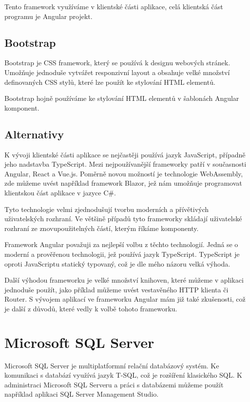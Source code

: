 Tento framework využíváme v klientské části aplikace, celá klientská část programu je Angular projekt.

\subsection{Bootstrap}
Bootstrap je CSS framework, který se používá k designu webových stránek.
Umožňuje jednoduše vytvářet responzivní layout a obsahuje velké množství definovaných CSS stylů, které lze použít ke stylování HTML elementů.
\cite{BootstrapDocs}

Bootstrap hojně používáme ke stylování HTML elementů v šablonách Angular komponent.

\subsection{Alternativy}
K vývoji klientské části aplikace se nejčastěji používá jazyk JavaScript, případně jeho nadstavba TypeScript. Mezi nejpoužívanější frameworky patří v současnosti Angular, React a Vue.js. 
Poměrně novou možností je technologie WebAssembly, zde můžeme uvést například framework Blazor, jež nám umožňuje programovat klientskou část aplikace v jazyce C\#.

Tyto technologie velmi zjednodušují tvorbu moderních a přívětivých uživatelských rozhraní. 
Ve většině případů tyto frameworky skládají uživatelské rozhraní ze znovupoužitelných částí, kterým říkáme komponenty.

Framework Angular považuji za nejlepší volbu z těchto technologií. Jedná se o moderní a prověřenou technologii, jež používá jazyk TypeScript. TypeScript je oproti JavaScriptu statický typovaný, což je dle mého názoru velká výhoda. 

Další výhodou frameworku je velké množství knihoven, které můžeme v aplikaci jednoduše použít, jako příklad můžeme uvést vestavěného HTTP klienta či Router. 
S vývojem aplikací ve frameworku Angular mám již také zkušenosti, což je další z důvodů, které vedly k volbě tohoto frameworku.

\section{Microsoft SQL Server}
Microsoft SQL Server je multiplatformní relační databázový systém. Ke komunikaci s databází využívá jazyk T-SQL, což je rozšíření klasického SQL. K administraci Microsoft SQL Serveru a práci s databázemi můžeme použít například aplikaci SQL Server Management Studio.
\cite{SqlServerDocs}

